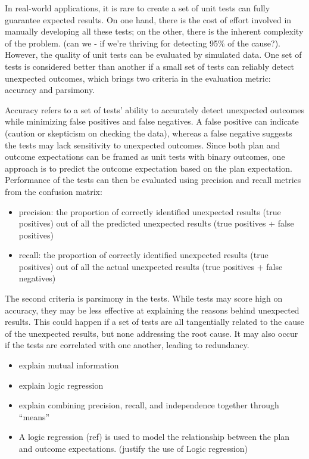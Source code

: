 \documentclass[
]{jds}
\providecommand{\tightlist}{%
  \setlength{\itemsep}{0pt}\setlength{\parskip}{0pt}}\usepackage{longtable,booktabs,array}
\begin{document}
In real-world applications, it is rare to create a set of unit tests can
fully guarantee expected results. On one hand, there is the cost of
effort involved in manually developing all these tests; on the other,
there is the inherent complexity of the problem. (can we - if we're
thriving for detecting 95\% of the cause?). However, the quality of unit
tests can be evaluated by simulated data. One set of tests is considered
better than another if a small set of tests can reliably detect
unexpected outcomes, which brings two criteria in the evaluation metric:
accuracy and parsimony.

Accuracy refers to a set of tests' ability to accurately detect
unexpected outcomes while minimizing false positives and false
negatives. A false positive can indicate (caution or skepticism on
checking the data), whereas a false negative suggests the tests may lack
sensitivity to unexpected outcomes. Since both plan and outcome
expectations can be framed as unit tests with binary outcomes, one
approach is to predict the outcome expectation based on the plan
expectation. Performance of the tests can then be evaluated using
precision and recall metrics from the confusion matrix:

\begin{itemize}
\tightlist
\item
  precision: the proportion of correctly identified unexpected results
  (true positives) out of all the predicted unexpected results (true
  positives + false positives)
\item
  recall: the proportion of correctly identified unexpected results
  (true positives) out of all the actual unexpected results (true
  positives + false negatives)
\end{itemize}

The second criteria is parsimony in the tests. While tests may score
high on accuracy, they may be less effective at explaining the reasons
behind unexpected results. This could happen if a set of tests are all
tangentially related to the cause of the unexpected results, but none
addressing the root cause. It may also occur if the tests are correlated
with one another, leading to redundancy.

\begin{itemize}
\item
  explain mutual information
\item
  explain logic regression
\item
  explain combining precision, recall, and independence together through
  ``means''
\item
  A logic regression (ref) is used to model the relationship between the
  plan and outcome expectations. (justify the use of Logic regression)
\end{itemize}
\end{document}
